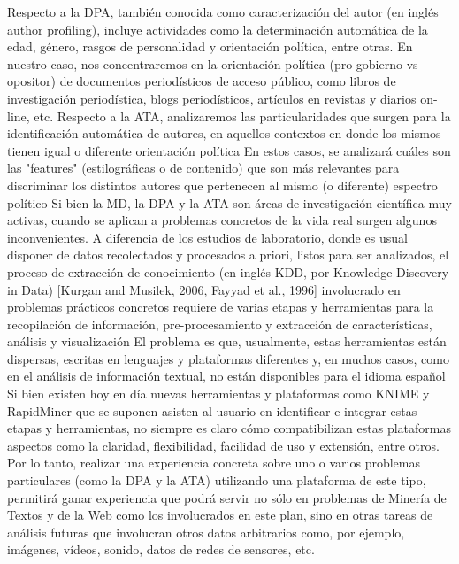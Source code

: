 \documentclass[12pt, runningheads,a4]{book}
\begin{document}
Respecto a la DPA, también conocida como caracterización del autor (en inglés author profiling), incluye actividades como la determinación automática de la edad, género, rasgos de personalidad y orientación política, entre otras. En nuestro caso, nos concentraremos en la orientación política (pro-gobierno vs opositor) de documentos periodísticos de acceso público, como libros de investigación periodística, blogs periodísticos, artículos en revistas y diarios on-line, etc.
Respecto a la ATA, analizaremos las particularidades que surgen para la identificación automática de autores, en aquellos contextos en donde los mismos tienen igual o diferente orientación política En estos casos, se analizará cuáles son las "features" (estilográficas o de contenido) que son más relevantes para discriminar los distintos autores que pertenecen al mismo (o diferente) espectro político
Si bien la MD, la DPA y la ATA son áreas de investigación científica muy activas, cuando se aplican a problemas concretos de la vida real surgen algunos inconvenientes. 
A diferencia de los estudios de laboratorio, donde es usual disponer de datos recolectados y procesados a priori, listos para ser analizados, el proceso de extracción de conocimiento (en inglés KDD, por Knowledge Discovery in Data) [Kurgan and Musilek, 2006, Fayyad et al., 1996] involucrado en problemas prácticos concretos requiere de varias etapas y herramientas para la recopilación de información, pre-procesamiento y extracción de características, análisis y visualización 
El problema es que, usualmente, estas herramientas están dispersas, escritas en lenguajes y plataformas diferentes y, en muchos casos, como en el análisis de información textual, no están disponibles para el idioma español 
Si bien existen hoy en día nuevas herramientas y plataformas como KNIME y RapidMiner que se suponen asisten al usuario en identificar e integrar estas etapas y herramientas, no siempre es claro cómo compatibilizan estas
plataformas aspectos como la claridad, flexibilidad, facilidad de uso y extensión, entre otros. Por lo tanto, realizar una experiencia concreta sobre uno o varios problemas particulares (como la DPA y la ATA) utilizando una plataforma de este tipo, permitirá ganar experiencia que podrá servir no sólo en problemas de Minería de Textos y de la Web como los involucrados en este plan, sino en otras tareas de análisis futuras que involucran
otros datos arbitrarios como, por ejemplo, imágenes, vídeos, sonido, datos de redes de sensores, etc.
\vskip 0.5cm

\end{document}
